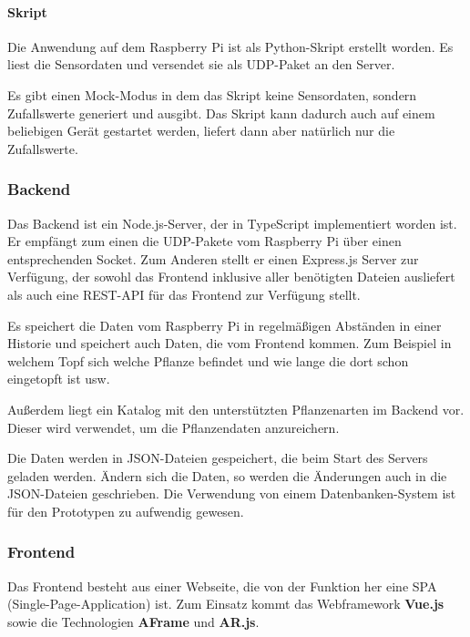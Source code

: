 \hypertarget{skript}{%
\paragraph{Skript}\label{skript}}

Die Anwendung auf dem Raspberry Pi ist als Python-Skript erstellt
worden. Es liest die Sensordaten und versendet sie als UDP-Paket an den
Server.

Es gibt einen Mock-Modus in dem das Skript keine Sensordaten, sondern
Zufallswerte generiert und ausgibt. Das Skript kann dadurch auch auf
einem beliebigen Gerät gestartet werden, liefert dann aber natürlich nur
die Zufallswerte.

\hypertarget{backend}{%
\subsubsection{Backend}\label{backend}}

Das Backend ist ein Node.js-Server, der in TypeScript implementiert
worden ist. Er empfängt zum einen die UDP-Pakete vom Raspberry Pi über
einen entsprechenden Socket. Zum Anderen stellt er einen Express.js
Server zur Verfügung, der sowohl das Frontend inklusive aller benötigten
Dateien ausliefert als auch eine REST-API für das Frontend zur Verfügung
stellt.

Es speichert die Daten vom Raspberry Pi in regelmäßigen Abständen in
einer Historie und speichert auch Daten, die vom Frontend kommen. Zum
Beispiel in welchem Topf sich welche Pflanze befindet und wie lange die
dort schon eingetopft ist usw.

Außerdem liegt ein Katalog mit den unterstützten Pflanzenarten im
Backend vor. Dieser wird verwendet, um die Pflanzendaten anzureichern.

Die Daten werden in JSON-Dateien gespeichert, die beim Start des Servers
geladen werden. Ändern sich die Daten, so werden die Änderungen auch in
die JSON-Dateien geschrieben. Die Verwendung von einem
Datenbanken-System ist für den Prototypen zu aufwendig gewesen.

\hypertarget{frontend}{%
\subsubsection{Frontend}\label{frontend}}

Das Frontend besteht aus einer Webseite, die von der Funktion her eine
SPA (Single-Page-Application) ist. Zum Einsatz kommt das Webframework
\textbf{Vue.js} sowie die Technologien \textbf{AFrame} und
\textbf{AR.js}.

